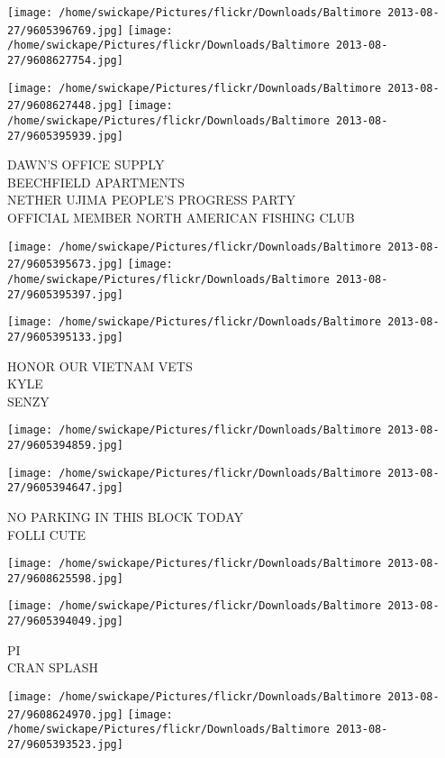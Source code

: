 \documentclass[10pt,letterpaper]{article}
\begin{document}
\texttt{[image: /home/swickape/Pictures/flickr/Downloads/Baltimore 2013-08-27/9605396769.jpg]}
\texttt{[image: /home/swickape/Pictures/flickr/Downloads/Baltimore 2013-08-27/9608627754.jpg]}

\texttt{[image: /home/swickape/Pictures/flickr/Downloads/Baltimore 2013-08-27/9608627448.jpg]}
\texttt{[image: /home/swickape/Pictures/flickr/Downloads/Baltimore 2013-08-27/9605395939.jpg]}

DAWN'S OFFICE SUPPLY\\
BEECHFIELD APARTMENTS\\
NETHER UJIMA PEOPLE'S PROGRESS PARTY\\
OFFICIAL MEMBER NORTH AMERICAN FISHING CLUB
\pagebreak

\texttt{[image: /home/swickape/Pictures/flickr/Downloads/Baltimore 2013-08-27/9605395673.jpg]}
\texttt{[image: /home/swickape/Pictures/flickr/Downloads/Baltimore 2013-08-27/9605395397.jpg]}

\vspace{0.25in}
\texttt{[image: /home/swickape/Pictures/flickr/Downloads/Baltimore 2013-08-27/9605395133.jpg]}

HONOR OUR VIETNAM VETS\\
KYLE\\
SENZY
\pagebreak

\texttt{[image: /home/swickape/Pictures/flickr/Downloads/Baltimore 2013-08-27/9605394859.jpg]}

\vspace{0.25in}
\texttt{[image: /home/swickape/Pictures/flickr/Downloads/Baltimore 2013-08-27/9605394647.jpg]}

NO PARKING IN THIS BLOCK TODAY\\
FOLLI CUTE
\pagebreak

\texttt{[image: /home/swickape/Pictures/flickr/Downloads/Baltimore 2013-08-27/9608625598.jpg]}

\vspace{0.25in}
\texttt{[image: /home/swickape/Pictures/flickr/Downloads/Baltimore 2013-08-27/9605394049.jpg]}

PI\\
CRAN SPLASH
\pagebreak

\texttt{[image: /home/swickape/Pictures/flickr/Downloads/Baltimore 2013-08-27/9608624970.jpg]}
\texttt{[image: /home/swickape/Pictures/flickr/Downloads/Baltimore 2013-08-27/9605393523.jpg]}
\end{document}
